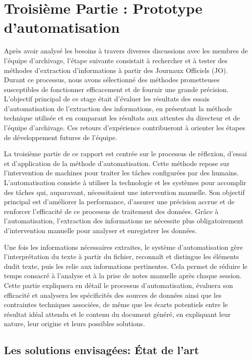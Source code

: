 \chapter*{Troisième Partie : Prototype d’automatisation}
\label{ch:prototype_automatisation}
\setcounter{chapter}{3} 

Après avoir analysé les besoins à travers diverses discussions avec les membres de l'équipe d'archivage, l'étape suivante consistait à rechercher et à tester des méthodes d'extraction d'informations à partir des Journaux Officiels (JO). Durant ce processus, nous avons sélectionné des méthodes prometteuses susceptibles de fonctionner efficacement et de fournir une grande précision. L'objectif principal de ce stage était d'évaluer les résultats des essais d'automatisation de l'extraction des informations, en présentant la méthode technique utilisée et en comparant les résultats aux attentes du directeur et de l'équipe d'archivage. Ces retours d'expérience contribueront à orienter les étapes de développement futures de l'équipe.

La troisième partie de ce rapport est centrée sur le processus de réflexion, d'essai et d'application de la méthode d'automatisation. Cette méthode repose sur l'intervention de machines pour traiter les tâches configurées par des humains. L'automatisation consiste à utiliser la technologie et les systèmes pour accomplir des tâches qui, auparavant, nécessitaient une intervention manuelle. Son objectif principal est d'améliorer la performance, d'assurer une précision accrue et de renforcer l'efficacité de ce processus de traitement des données. Grâce à l'automatisation, l'extraction des informations ne nécessite plus obligatoirement d'intervention manuelle pour analyser et enregistrer les données.

Une fois les informations nécessaires extraites, le système d'automatisation gère l'interprétation du texte à partir du fichier, reconnaît et distingue les éléments dudit texte, puis les relie aux informations pertinentes. Cela permet de réduire le temps consacré à l'analyse et à la prise de notes manuelle après chaque session. Cette partie expliquera en détail le processus d'automatisation, évaluera son efficacité et analysera les spécificités des sources de données ainsi que les contraintes techniques associées, de même que les écarts potentiels entre le résultat idéal attendu et le contenu du document généré, en expliquant leur nature, leur origine et leurs possibles solutions.

\section{Les solutions envisagées: État de l'art}

